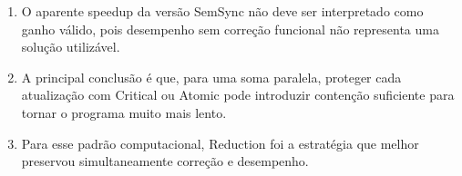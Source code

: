 \begin{enumerate}
    \item O aparente speedup da versão SemSync não deve ser interpretado como
    ganho válido, pois desempenho sem correção funcional não representa uma
    solução utilizável.

    \item A principal conclusão é que, para uma soma paralela, proteger cada
    atualização com Critical ou Atomic pode introduzir contenção suficiente
    para tornar o programa muito mais lento.

    \item Para esse padrão computacional, Reduction foi a estratégia que
    melhor preservou simultaneamente correção e desempenho.

\end{enumerate}
